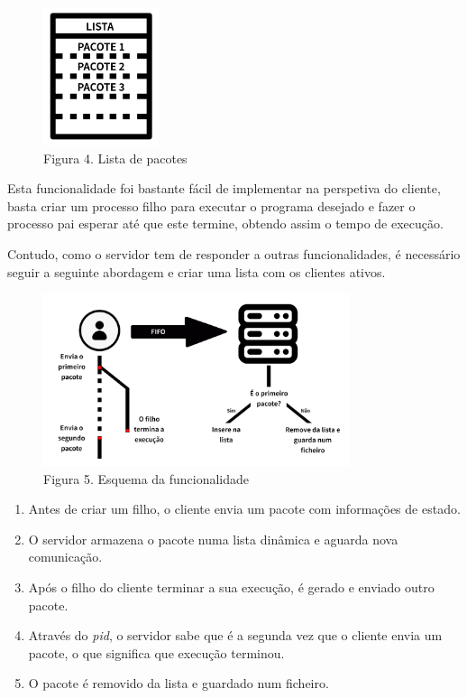 \documentclass[12pt,a4paper]{report}
\begin{document}
        \begin{figure}
            \begin{center}
                \vspace{-22pt}
                \includegraphics[width=0.3\textwidth]{images/list.png}
                \caption*{Figura 4. Lista de pacotes}
                \vspace{-30pt}
            \end{center}
        \end{figure}

        Esta funcionalidade foi bastante fácil de implementar na perspetiva do cliente, basta criar um processo filho para executar o programa desejado e fazer o processo pai esperar até que este termine, obtendo assim o tempo de execução.

        Contudo, como o servidor tem de responder a outras funcionalidades, é necessário seguir a seguinte abordagem e criar uma lista com os clientes ativos.

        \begin{figure}[hb!]
            \centering
            \includegraphics[width=0.8\textwidth]{images/uniq.png}
            \caption*{Figura 5. Esquema da funcionalidade}
            \label{fig:Uniq}
        \end{figure}

        \begin{enumerate}
            \item Antes de criar um filho, o cliente envia um pacote com informações de estado.
            \item O servidor armazena o pacote numa lista dinâmica e aguarda nova comunicação.
            \item Após o filho do cliente terminar a sua execução, é gerado e enviado outro pacote.
            \item Através do \textit{pid}, o servidor sabe que é a segunda vez que o cliente envia um pacote, o que significa que execução terminou.
            \item O pacote é removido da lista e guardado num ficheiro.
        \end{enumerate}
\end{document}
